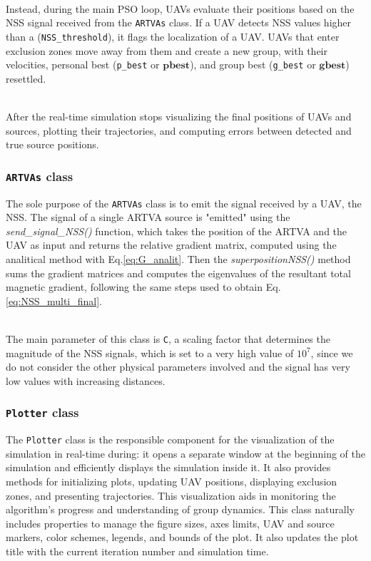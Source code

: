 \documentclass[main]{subfiles}
\begin{document}
\noindent\\
Instead, during the main PSO loop, UAVs evaluate 
their positions based on the NSS signal received from the \texttt{ARTVAs} class. 
If a UAV detects NSS values higher than a (\texttt{NSS\_threshold}),
it flags the localization of a UAV.
UAVs that enter exclusion zones move away from them and 
create a new group, with their velocities, 
personal best (\texttt{p\_best} or $\mathbf{pbest}$), and group best 
(\texttt{g\_best} or $\mathbf{gbest}$) resettled.

\noindent\\
After the real-time simulation stops visualizing the final 
positions of UAVs and sources, plotting their trajectories, 
and computing errors between detected and true source positions.

\subsubsection{\texttt{ARTVAs} class}
The sole purpose of the \texttt{ARTVAs} class is to 
emit the signal received by a UAV, the NSS. 
The signal of a single ARTVA source is "emitted" using the \textit{send\_signal\_NSS()} 
function, which takes the position of the ARTVA and the UAV as 
input and returns the relative gradient matrix,
computed using the analitical method with Eq.\ref{eq:G_analit}.
Then the \textit{superpositionNSS()} method sums 
the gradient matrices and computes the eigenvalues of the resultant 
total magnetic gradient,
following the same steps used to obtain Eq.\ref{eq:NSS_multi_final}.

\noindent\\
The main parameter of this class is \texttt{C}, a 
scaling factor that determines the magnitude of the NSS signals, 
which is set to a very high value of $10^7$, since we do not consider
the other physical parameters involved and the signal has very low values
with increasing distances.

\subsubsection{\texttt{Plotter} class}
The \texttt{Plotter} class is the responsible component 
for the visualization of the simulation in real-time during: 
it opens a separate window at the beginning
of the simulation and efficiently displays the simulation inside it.
It also provides methods for initializing plots, updating UAV positions, 
displaying exclusion zones, and presenting trajectories. 
This visualization aids in monitoring the algorithm's 
progress and understanding of group dynamics.
This class naturally includes properties to manage 
the figure sizes, axes limits, UAV and source markers, color schemes, 
legends, and bounds of the plot.
It also updates the plot title with the current iteration 
number and simulation time.
\end{document}
